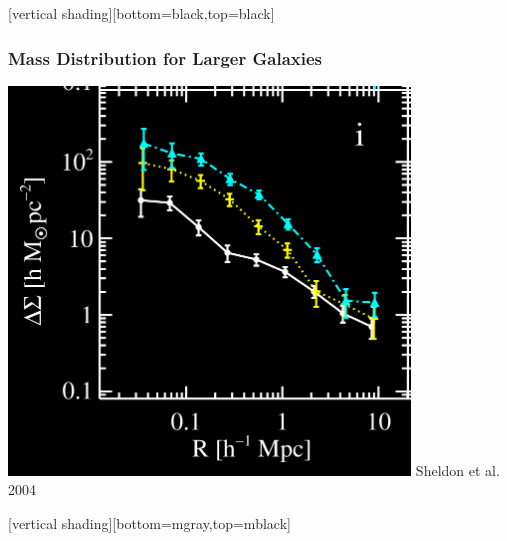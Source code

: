 \documentclass{beamer}
\begin{document}
{
    [vertical shading][bottom=black,top=black]


    \frame
    {
        \frametitle{Mass Distribution for Larger Galaxies}

                \begin{center}
                    \includegraphics[width=0.8\textwidth]{deltasig_all_allband_bylum_icolor_crop.png}
                    \newline
                    {\color{gold}Sheldon et al. 2004}
                \end{center}
    }

    [vertical shading][bottom=mgray,top=mblack]
}
\end{document}
